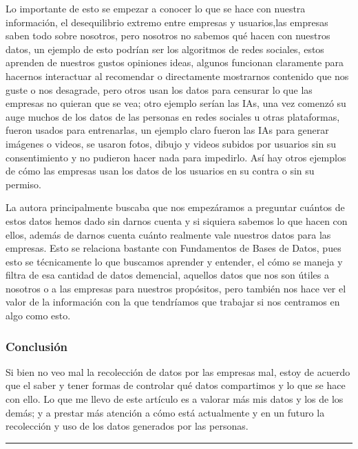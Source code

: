 \vspace{0.2cm}

Lo importante de esto se empezar a conocer lo que se hace con nuestra información, el desequilibrio extremo entre empresas y usuarios,las empresas saben todo sobre nosotros, pero nosotros no sabemos qué hacen con nuestros datos, un ejemplo de esto podrían ser los algoritmos de redes sociales, estos aprenden de nuestros gustos opiniones ideas, algunos funcionan claramente para hacernos interactuar al recomendar o directamente mostrarnos contenido que nos guste o nos desagrade, pero otros usan los datos para censurar lo que las empresas no quieran que se vea; otro ejemplo serían las IAs, una vez comenzó su auge muchos de los datos de las personas en redes sociales u otras plataformas, fueron usados para entrenarlas, un ejemplo claro fueron las IAs para generar imágenes o videos, se usaron fotos, dibujo y videos subidos por usuarios sin su consentimiento y no pudieron hacer nada para impedirlo. Así hay otros ejemplos de cómo las empresas usan los datos de los usuarios en su contra o sin su permiso.

\vspace{0.2cm}

La autora principalmente buscaba que nos empezáramos a preguntar cuántos de estos datos hemos dado sin darnos cuenta y si siquiera sabemos lo que hacen con ellos, además de darnos cuenta cuánto realmente vale nuestros datos para las empresas. Esto se relaciona bastante con Fundamentos de Bases de Datos, pues esto se técnicamente lo que buscamos aprender y entender, el cómo se maneja y filtra de esa cantidad de datos demencial, aquellos datos que nos son útiles a nosotros o a las empresas para nuestros propósitos, pero también nos hace ver el valor de la información con la que tendríamos que trabajar si nos centramos en algo como esto.

\vspace{0.2cm}

\subsubsection*{\textcolor{unamblue}{Conclusión}}

Si bien no veo mal la recolección de datos por las empresas mal, estoy de acuerdo que el saber y tener formas de controlar qué datos compartimos y  lo que se hace con ello. Lo que me llevo de este artículo es a valorar más mis datos y los de los demás; y a prestar más atención a cómo está actualmente y en un futuro la recolección y uso de los datos generados por las personas.

\vspace{0.2cm}

\noindent
\textcolor{unamblue}{\rule{\textwidth}{1.2pt}}
